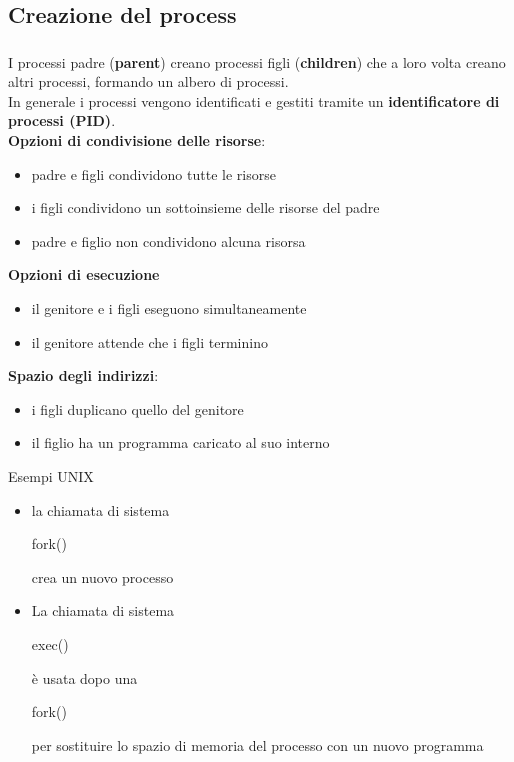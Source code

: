\documentclass{beamer}
\newenvironment{mainframe}{
	\begin{frame}
		\frametitle{\insertsubsection}
		\framesubtitle{\insertsection}
	}{
	\end{frame}
}
\begin{document}
\subsection{Creazione del process}
\begin{mainframe}
	I processi padre (\textbf{parent}) creano processi figli (\textbf{children}) che a loro volta creano altri processi, formando un albero di processi.\\
	In generale i processi vengono identificati e gestiti tramite un \textbf{identificatore di processi (PID)}.\\
	\textbf{Opzioni di condivisione delle risorse}:
	\begin{itemize}
		\item padre e figli condividono tutte le risorse
		\item i figli condividono un sottoinsieme delle risorse del padre
		\item padre e figlio non condividono alcuna risorsa
	\end{itemize}
	\textbf{Opzioni di esecuzione}
	\begin{itemize}
		\item il genitore e i figli eseguono simultaneamente
		\item il genitore attende che i figli terminino
	\end{itemize}
\end{mainframe}
\begin{frame}
	\textbf{Spazio degli indirizzi}: 
	\begin{itemize}
		\item i figli duplicano quello del genitore
		\item il figlio ha un programma caricato al suo interno
	\end{itemize}
	Esempi UNIX
	\begin{itemize}
		\item la chiamata di sistema \begin{semiverbatim}
			fork()
		\end{semiverbatim} crea un nuovo processo
		\item La chiamata di sistema \begin{semiverbatim}
			exec()
		\end{semiverbatim} è usata dopo una \begin{semiverbatim}
		fork()
		\end{semiverbatim} per sostituire lo spazio di memoria del processo con un nuovo programma
	\end{itemize}
\end{frame}
\end{document}
